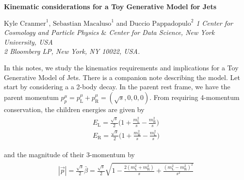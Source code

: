 \documentclass[12pt]{article}
\newcommand{\bea}{\begin{eqnarray}\begin{aligned}}
\newcommand{\eea}{\end{aligned}\end{eqnarray}}
\begin{document}
%


\begin{center}

\vskip 1cm
{\Large \bf Kinematic considerations for a Toy Generative Model for Jets}





\vskip0.2cm{}

\vskip 1.0cm
{\large $\text{Kyle Cranmer}^1$, $\text{Sebastian Macaluso}^1$ and $\text{Duccio Pappadopulo}^2$}
\vskip 0.6cm
{\small \it 1 Center for Cosmology and Particle Physics $\&$ Center for Data Science, New York University, USA} \\
{\small \it 2 Bloomberg LP, New York, NY 10022, USA.}
\vskip 2.0cm

\end{center}





%




In this notes, we study the kinematics requirements and implications for a Toy Generative Model of Jets. There is a companion note describing the model.
Let start by considering a a 2-body decay. In the parent rest frame, we have the parent momentum $p^\mu_p=p^\mu_{\text{L}}+p^\mu_{\text{R}}=(\sqrt{s}, 0, 0, 0)$. From requiring 4-momentum conservation, the children energies are given by
\bea
E_{\text{L}}=\frac{\sqrt{s}}{2}\bigg(1+\frac{m_{\text{L}}^2}{s}-\frac{m_{\text{R}}^2}{s} \bigg) \\
E_{\text{R}}=\frac{\sqrt{s}}{2}\bigg(1+\frac{m_{\text{R}}^2}{s}-\frac{m_{\text{L}}^2}{s} \bigg)
\eea

and the magnitude of their 3-momentum by
\bea\label{eq:Prestframe}
|\vec{p}| =\frac{\sqrt{s}}{2} \bar{\beta}=\frac{\sqrt{s}}{2} \sqrt{1-\frac{2 (m_{\text{L}}^2+m_{\text{R}}^2)}{s}+\frac{(m_{\text{L}}^2-m_{\text{R}}^2)^2}{s^2}}
\eea
\end{document}
